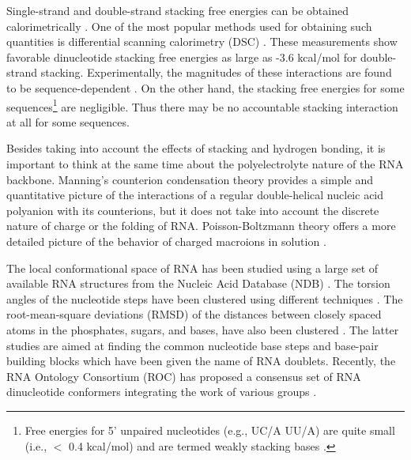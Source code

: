 Single-strand and double-strand stacking free energies can be obtained
calorimetrically \cite{freier1985}.   One of the  most popular methods
used   for  obtaining   such  quantities   is   differential  scanning
calorimetry (DSC) \cite{marky1982}.  These measurements show favorable
dinucleotide  stacking free  energies as  large as  -3.6  kcal/mol for
double-strand  stacking.   Experimentally,  the  magnitudes  of  these
interactions      are     found      to      be     sequence-dependent
\cite{bloomfield2000}. On  the other hand, the  stacking free energies
for some sequences\footnote{Free  energies for 5' unpaired nucleotides
  (e.g., UC/A UU/A)  are quite small (i.e., $<$  0.4 kcal/mol) and are
  termed weakly stacking  bases \cite{burkard1999, burkard1999b}.} are
negligible.  Thus there may  be no accountable stacking interaction at
all for some sequences.

Besides  taking into  account  the effects  of  stacking and  hydrogen
bonding,  it  is  important  to  think  at the  same  time  about  the
polyelectrolyte  nature  of the  RNA  backbone.  Manning's  counterion
condensation theory \cite{manning1977,  manning2003} provides a simple
and   quantitative  picture   of   the  interactions   of  a   regular
double-helical  nucleic acid  polyanion with  its counterions,  but it
does   not  take   into  account   the  discrete   nature   of  charge
\cite{bloomfield2000} or the  folding of RNA. Poisson-Boltzmann theory
offers a more detailed picture of the behavior of charged macroions in
solution \cite{antypov2005, xu2007}.

The local conformational  space of RNA has been  studied using a large
set of available  RNA structures from the Nucleic  Acid Database (NDB)
\cite{berman1992}.  The  torsion angles  of the nucleotide  steps have
been   clustered    using   different   techniques   \cite{murray2003,
  schneider2004}.   The  root-mean-square  deviations  (RMSD)  of  the
distances between closely spaced  atoms in the phosphates, sugars, and
bases, have also been  clustered \cite{sykes2005}.  The latter studies
are aimed  at finding the  common nucleotide base steps  and base-pair
building  blocks which  have  been  given the  name  of RNA  doublets.
Recently, the  RNA Ontology Consortium (ROC) has  proposed a consensus
set  of RNA dinucleotide  conformers integrating  the work  of various
groups \cite{richardson2008}.


